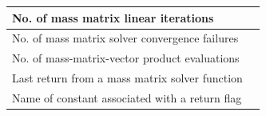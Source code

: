\documentclass[letterpaper,10pt,english]{sphinxmanual}
\begin{document}
\begin{tabulary}{\linewidth}{|L|L|}
No. of mass matrix linear iterations
 & 
{\hyperref[c_interface/User_callable:ARKSpilsGetNumMassIters]{}}
\\\hline

No. of mass matrix solver convergence failures
 & 
{\hyperref[c_interface/User_callable:ARKSpilsGetNumMassConvFails]{}}
\\\hline

No. of mass-matrix-vector product evaluations
 & 
{\hyperref[c_interface/User_callable:ARKSpilsGetNumMtimesEvals]{}}
\\\hline

Last return from a mass matrix solver function
 & 
{\hyperref[c_interface/User_callable:ARKSpilsGetLastMassFlag]{}}
\\\hline

Name of constant associated with a return flag
 & 
{\hyperref[c_interface/User_callable:ARKSpilsGetReturnFlagName]{}}
\\\hline
\end{tabulary}

\end{document}
